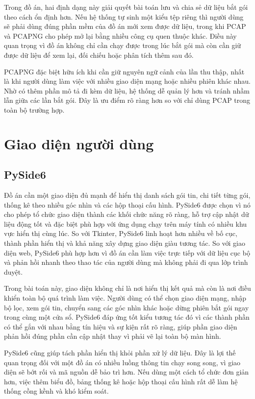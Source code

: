 \documentclass[../DoAn.tex]{subfiles}
\begin{document}
Trong đồ án, hai định dạng này giải quyết bài toán lưu và chia sẻ dữ liệu bắt gói theo cách ổn định hơn. Nếu hệ thống tự sinh một kiểu tệp riêng thì người dùng sẽ phải dùng đúng phần mềm của đồ án mới xem được dữ liệu, trong khi PCAP và PCAPNG cho phép mở lại bằng nhiều công cụ quen thuộc khác. Điều này quan trọng vì đồ án không chỉ cần chạy được trong lúc bắt gói mà còn cần giữ được dữ liệu để xem lại, đối chiếu hoặc phân tích thêm sau đó.

PCAPNG đặc biệt hữu ích khi cần giữ nguyên ngữ cảnh của lần thu thập, nhất là khi người dùng làm việc với nhiều giao diện mạng hoặc nhiều phiên khác nhau. Nhờ có thêm phần mô tả đi kèm dữ liệu, hệ thống dễ quản lý hơn và tránh nhầm lẫn giữa các lần bắt gói. Đây là ưu điểm rõ ràng hơn so với chỉ dùng PCAP trong toàn bộ trường hợp.

\section{Giao diện người dùng}
\subsection{PySide6}
Đồ án cần một giao diện đủ mạnh để hiển thị danh sách gói tin, chi tiết từng gói, thống kê theo nhiều góc nhìn và các hộp thoại cấu hình. PySide6 được chọn vì nó cho phép tổ chức giao diện thành các khối chức năng rõ ràng, hỗ trợ cập nhật dữ liệu động tốt và đặc biệt phù hợp với ứng dụng chạy trên máy tính có nhiều khu vực hiển thị cùng lúc. So với Tkinter, PySide6 linh hoạt hơn nhiều về bố cục, thành phần hiển thị và khả năng xây dựng giao diện giàu tương tác. So với giao diện web, PySide6 phù hợp hơn vì đồ án cần làm việc trực tiếp với dữ liệu cục bộ và phản hồi nhanh theo thao tác của người dùng mà không phải đi qua lớp trình duyệt.

Trong bài toán này, giao diện không chỉ là nơi hiển thị kết quả mà còn là nơi điều khiển toàn bộ quá trình làm việc. Người dùng có thể chọn giao diện mạng, nhập bộ lọc, xem gói tin, chuyển sang các góc nhìn khác hoặc dừng phiên bắt gói ngay trong cùng một cửa sổ. PySide6 đáp ứng tốt kiểu tương tác đó vì các thành phần có thể gắn với nhau bằng tín hiệu và sự kiện rất rõ ràng, giúp phần giao diện phản hồi đúng phần cần cập nhật thay vì phải vẽ lại toàn bộ màn hình.

PySide6 cũng giúp tách phần hiển thị khỏi phần xử lý dữ liệu. Đây là lợi thế quan trọng đối với một đồ án có nhiều luồng thông tin chạy song song, vì giao diện sẽ bớt rối và mã nguồn dễ bảo trì hơn. Nếu dùng một cách tổ chức đơn giản hơn, việc thêm biểu đồ, bảng thống kê hoặc hộp thoại cấu hình rất dễ làm hệ thống cồng kềnh và khó kiểm soát.
\end{document}
